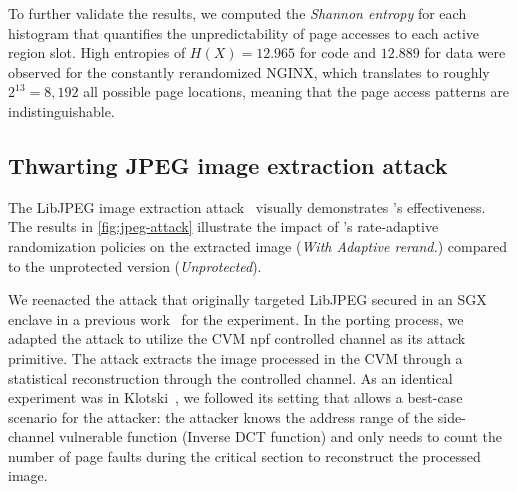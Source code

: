 To further validate the results, we computed the \emph{Shannon entropy} for each histogram that quantifies the unpredictability of page accesses to each active region slot.
High entropies of $H(X) = 12.965$ for code and $12.889$ for data were observed for the constantly rerandomized NGINX, which translates to roughly $2^{13} = 8,192$ all possible page locations, meaning that the page access patterns are indistinguishable.












\subsection{Thwarting JPEG image extraction attack}

\label{subsec:jpeg-attack}
The LibJPEG image extraction attack~\cite{xu2015controlledchannel} visually demonstrates \thename's effectiveness.
The results in \autoref{fig:jpeg-attack} illustrate the impact of \thename's rate-adaptive randomization policies on the extracted image (\emph{With Adaptive rerand.}) compared to the unprotected version (\emph{Unprotected}).

 We reenacted the attack that originally targeted LibJPEG secured in an SGX enclave in a previous work~\cite{xu2015controlledchannel} for the experiment.
In the porting process, we adapted the attack to utilize the CVM \gls{npf} controlled channel as its attack primitive.
The attack extracts the image processed in the CVM through a statistical reconstruction through the controlled channel.
As an identical experiment was in Klotski~\cite{zhang2020klotski}, we followed its setting that allows a best-case scenario for the attacker: the attacker knows the address range of the side-channel vulnerable function (Inverse DCT function) and only needs to count the number of page faults during the critical section to reconstruct the processed image.

